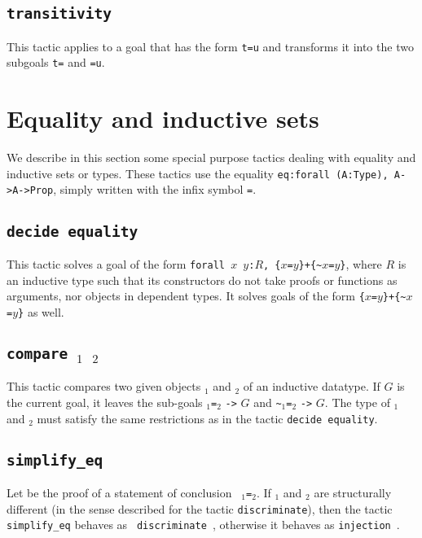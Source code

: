 \begin{coq_example*}
\subsection{\tt transitivity \term}

This tactic applies to a goal that has the form {\tt t=u}
and transforms it into the two subgoals
{\tt t={\term}} and {\tt {\term}=u}.

\section{Equality and inductive sets}

We describe in this section some special purpose tactics dealing with
equality and inductive sets or types. These tactics use the equality
{\tt eq:forall (A:Type), A->A->Prop}, simply written with the
infix symbol {\tt =}.

\subsection{\tt decide equality}
\label{decideequality}

This tactic solves a goal of the form
{\tt forall $x$ $y$:$R$, \{$x$=$y$\}+\{\verb|~|$x$=$y$\}}, where $R$
is an inductive type such that its constructors do not take proofs or
functions as arguments, nor objects in dependent types.
It solves goals of the form {\tt \{$x$=$y$\}+\{\verb|~|$x$=$y$\}} as well.

\subsection{\tt compare \term$_1$ \term$_2$}

This tactic compares two given objects \term$_1$ and \term$_2$
of an inductive datatype. If $G$ is the current goal, it leaves the sub-goals
\term$_1${\tt =}\term$_2$ {\tt ->} $G$ and \verb|~|\term$_1${\tt =}\term$_2$
{\tt ->} $G$. The type
of \term$_1$ and \term$_2$ must satisfy the same restrictions as in the tactic
\texttt{decide equality}.

\subsection{\tt simplify\_eq \term}
\label{simplify-eq}

Let {\term} be the proof of a statement of conclusion {\tt
  {\term$_1$}={\term$_2$}}. If {\term$_1$} and
{\term$_2$} are structurally different (in the sense described for the
tactic {\tt discriminate}), then the tactic {\tt simplify\_eq} behaves as {\tt
  discriminate {\term}}, otherwise it behaves as {\tt injection
  {\term}}.


\end{coq_example*}
